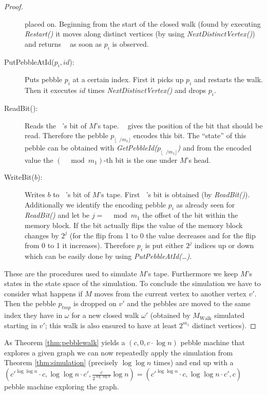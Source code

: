 \documentclass[draft,oneside]{scrartcl}
\DeclareMathOperator{\Tid}{T_{\text{id}}}
\DeclareMathOperator{\Thead}{T_{\text{head}}}
\begin{document}
\begin{proof}
\begin{description}
      placed on. Beginning from the start of the closed walk
      (found by executing \emph{Restart()} it moves along distinct vertices
      (by using \emph{NextDistinctVertex()}) and returns $\Tid$ as soon as
      $p_{i}$ is observed.
    \item[PutPebbleAtId($p_{i},\mathit{id}$):] Puts pebble $p_i$ at a certain
      index. First it picks up $p_{i}$ and restarts the walk. Then it executes
      $\mathit{id}$ times \emph{NextDistinctVertex()} and drops $p_{i}$.
    \item[ReadBit():] Reads the $\Thead$'s bit of $M$'s tape. $\Thead$ gives
      the position of the bit that should be read. Therefore the pebble
      $p_{\lfloor \Thead/m_{1}\rfloor}$ encodes this bit. The \enquote{state}
      of this pebble can be obtained with
      \emph{GetPebbleId($p_{\lfloor \Thead/m_{1}\rfloor}$)} and from the
      encoded value the $(\Thead\mod m_{1})$-th bit is the one under $M$'s
      head.
    \item[WriteBit($b$):] Writes $b$ to $\Thead$'s bit of $M$'s tape. First
      $\Thead$'s bit is obtained (by \emph{ReadBit()}). Additionally we
      identify the encoding pebble $p_{i}$ as already seen for
      \emph{ReadBit()} and let be $j = \Thead\mod m_{1}$ the offset of the bit
      within the memory block. If the bit actually flips the value of the
      memory block changes by $2^j$ (for the flip from 1 to 0 the value
      decreases and for the flip from 0 to 1 it increases). Therefore $p_{i}$
      is put either $2^j$ indices up or down which can be easily done by using
      \emph{PutPebbleAtId(\dots)}.
  \end{description}
  These are the procedures used to simulate $M$'s tape. Furthermore we keep
  $M$'s states in the state space of the simulation. To conclude the simulation
  we have to consider what happens if $M$ moves from the current vertex to
  another vertex $v'$. Then the pebble $p_{tmp}$ is dropped on $v'$ and the
  pebbles are moved to the same index they have in $\omega$ for a new closed
  walk $\omega'$ (obtained by $M_{\text{Walk}}$ simulated starting in $v'$;
  this walk is also ensured to have at least $2^{m_1}$ distinct vertices).
\end{proof}
As Theorem \ref{thm:pebblewalk} yields a $(c,0,c\cdot\log n)$ pebble machine
that explores a given graph we can now repeatedly apply the simulation
from Theorem \ref{thm:simulation} (precisely $\log\log n$ times) and end up
with a $(c'^{\log\log n}\cdot c, \log\log n\cdot c',
\frac{c}{2^{\log\log n}}\log n) =
(c'^{\log\log n}\cdot c, \log\log n\cdot c', c)$ pebble machine exploring the
graph.



\printbibliography
\end{document}
